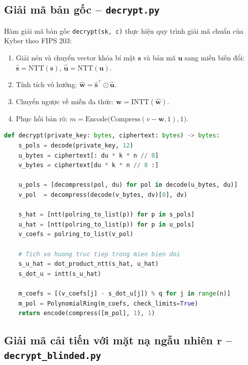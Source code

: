 \documentclass[../LuanVan.tex]{subfiles}
\begin{document}
\subsection{Giải mã bản gốc -- \texttt{decrypt.py}}

Hàm giải mã bản gốc \texttt{decrypt(sk, c)} thực hiện quy trình giải mã chuẩn của Kyber theo FIPS 203:
\begin{enumerate}[leftmargin=2cm]
    \item Giải nén và chuyển vector khóa bí mật $\mathbf{s}$ và bản mã $\mathbf{u}$ sang miền biến đổi: $\hat{\mathbf{s}} = \text{NTT}(\mathbf{s})$, $\hat{\mathbf{u}} = \text{NTT}(\mathbf{u})$.
    \item Tính tích vô hướng: $\hat{\mathbf{w}} = \hat{\mathbf{s}}^\top \odot \hat{\mathbf{u}}$.
    \item Chuyển ngược về miền đa thức: $\mathbf{w} = \text{INTT}(\hat{\mathbf{w}})$.
    \item Phục hồi bản rõ: $m = \text{Encode}\bigl(\text{Compress}(v - \mathbf{w}, 1), 1\bigr)$.
\end{enumerate}

\begin{lstlisting}[language=Python, style=pystyle, caption={Hàm giải mã bản gốc chuẩn hóa -- decrypt() trong decrypt.py}]
def decrypt(private_key: bytes, ciphertext: bytes) -> bytes:
    s_pols = decode(private_key, 12)
    u_bytes = ciphertext[: du * k * n // 8]
    v_bytes = ciphertext[du * k * n // 8 :]

    u_pols = [decompress(pol, du) for pol in decode(u_bytes, du)]
    v_pol  = decompress(decode(v_bytes, dv)[0], dv)

    s_hat = [ntt(polring_to_list(p)) for p in s_pols]
    u_hat = [ntt(polring_to_list(p)) for p in u_pols]
    v_coefs = polring_to_list(v_pol)

    # Tich vo huong truc tiep trong mien bien doi
    s_u_hat = dot_product_ntt(s_hat, u_hat)
    s_dot_u = intt(s_u_hat)

    m_coefs = [(v_coefs[j] - s_dot_u[j]) % q for j in range(n)]
    m_pol = PolynomialRing(m_coefs, check_limits=True)
    return encode(compress([m_pol], 1), 1)
\end{lstlisting}

\subsection{Giải mã cải tiến với mặt nạ ngẫu nhiên \texorpdfstring{$\mathbf{r}$}{r} -- \texttt{decrypt\_blinded.py}}
\label{subsec:blinding}
\end{document}
